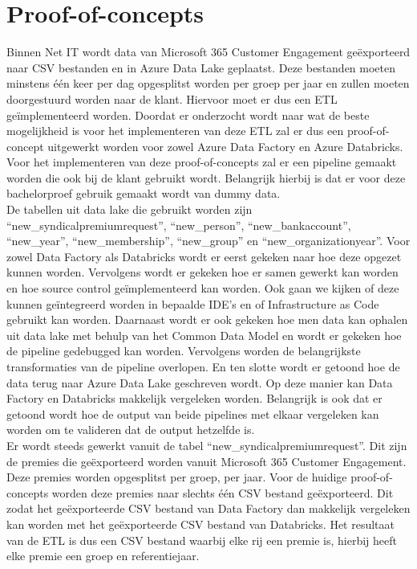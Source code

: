 \section{Proof-of-concepts}

Binnen Net IT wordt data van Microsoft 365 Customer Engagement geëxporteerd naar CSV bestanden en in Azure Data Lake geplaatst. Deze bestanden moeten minstens één keer per dag opgesplitst worden per groep per jaar en zullen moeten doorgestuurd worden naar de klant. Hiervoor moet er dus een ETL geïmplementeerd worden. Doordat er onderzocht wordt naar wat de beste mogelijkheid is voor het implementeren van deze ETL zal er dus een proof-of-concept uitgewerkt worden voor zowel Azure Data Factory en Azure Databricks. Voor het implementeren van deze proof-of-concepts zal er een pipeline gemaakt worden die ook bij de klant gebruikt wordt. Belangrijk hierbij is dat er voor deze bachelorproef gebruik gemaakt wordt van dummy data. \\
    

De tabellen uit data lake die gebruikt worden zijn ``new\_syndicalpremiumrequest'', ``new\_person'', ``new\_bankaccount'', ``new\_year'', ``new\_membership'', ``new\_group'' en ``new\_organizationyear''. Voor zowel Data Factory als Databricks wordt er eerst gekeken naar hoe deze opgezet kunnen worden. Vervolgens wordt er gekeken hoe er samen gewerkt kan worden en hoe source control geïmplementeerd kan worden. Ook gaan we kijken of deze kunnen geïntegreerd worden in bepaalde IDE's en of Infrastructure as Code gebruikt kan worden. Daarnaast wordt er ook gekeken hoe men data kan ophalen uit data lake met behulp van het Common Data Model en wordt er gekeken hoe de pipeline gedebugged kan worden. Vervolgens worden de belangrijkste transformaties van de pipeline overlopen. En ten slotte wordt er getoond hoe de data terug naar Azure Data Lake geschreven wordt. Op deze manier kan Data Factory en Databricks makkelijk vergeleken worden. Belangrijk is ook dat er getoond wordt hoe de output van beide pipelines met elkaar vergeleken kan worden om te valideren dat de output hetzelfde is.\\
    

Er wordt steeds gewerkt vanuit de tabel ``new\_syndicalpremiumrequest''. Dit zijn de premies die geëxporteerd worden vanuit Microsoft 365 Customer Engagement. Deze premies worden opgesplitst per groep, per jaar. Voor de huidige proof-of-concepts worden deze premies naar slechts één CSV bestand geëxporteerd. Dit zodat het geëxporteerde CSV bestand van Data Factory dan makkelijk vergeleken kan worden met het geëxporteerde CSV bestand van Databricks. Het resultaat van de ETL is dus een CSV bestand waarbij elke rij een premie is, hierbij heeft elke premie een groep en referentiejaar.

